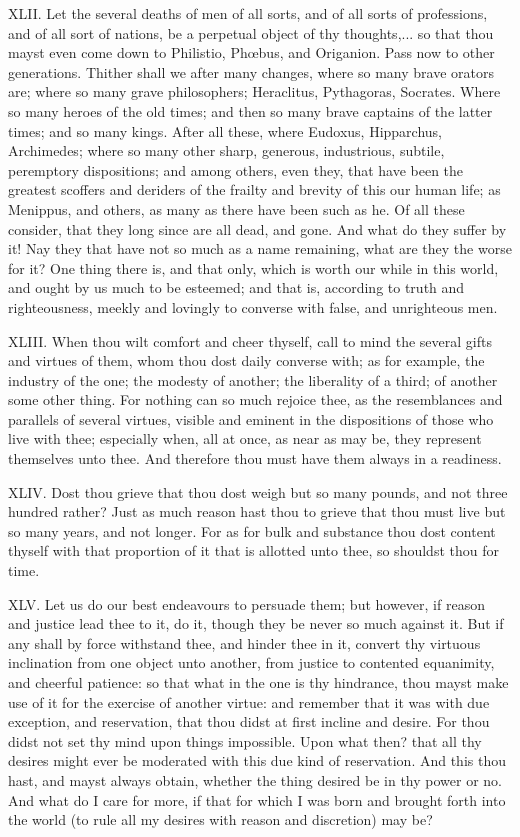 XLII. Let the several deaths of men of all sorts, and of all sorts of
professions, and of all sort of nations, be a perpetual object of thy
thoughts,... so that thou mayst even come down to Philistio, Phœbus, and
Origanion. Pass now to other generations. Thither shall we after many
changes, where so many brave orators are; where so many grave
philosophers; Heraclitus, Pythagoras, Socrates. Where so many heroes of
the old times; and then so many brave captains of the latter times; and so
many kings. After all these, where Eudoxus, Hipparchus, Archimedes; where
so many other sharp, generous, industrious, subtile, peremptory
dispositions; and among others, even they, that have been the greatest
scoffers and deriders of the frailty and brevity of this our human life;
as Menippus, and others, as many as there have been such as he. Of all
these consider, that they long since are all dead, and gone. And what do
they suffer by it! Nay they that have not so much as a name remaining,
what are they the worse for it? One thing there is, and that only, which
is worth our while in this world, and ought by us much to be esteemed; and
that is, according to truth and righteousness, meekly and lovingly to
converse with false, and unrighteous men.

XLIII. When thou wilt comfort and cheer thyself, call to mind the
several gifts and virtues of them, whom thou dost daily converse with; as
for example, the industry of the one; the modesty of another; the
liberality of a third; of another some other thing. For nothing can so
much rejoice thee, as the resemblances and parallels of several virtues,
visible and eminent in the dispositions of those who live with thee;
especially when, all at once, as near as may be, they represent themselves
unto thee. And therefore thou must have them always in a readiness.

XLIV. Dost thou grieve that thou dost weigh but so many pounds, and not
three hundred rather? Just as much reason hast thou to grieve that thou
must live but so many years, and not longer. For as for bulk and substance
thou dost content thyself with that proportion of it that is allotted unto
thee, so shouldst thou for time.

XLV. Let us do our best endeavours to persuade them; but however, if
reason and justice lead thee to it, do it, though they be never so much
against it. But if any shall by force withstand thee, and hinder thee in
it, convert thy virtuous inclination from one object unto another, from
justice to contented equanimity, and cheerful patience: so that what in
the one is thy hindrance, thou mayst make use of it for the exercise of
another virtue: and remember that it was with due exception, and
reservation, that thou didst at first incline and desire. For thou didst
not set thy mind upon things impossible. Upon what then? that all thy
desires might ever be moderated with this due kind of reservation. And
this thou hast, and mayst always obtain, whether the thing desired be in
thy power or no. And what do I care for more, if that for which I was born
and brought forth into the world (to rule all my desires with reason and
discretion) may be?

